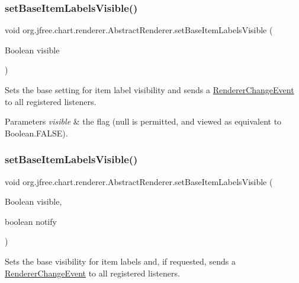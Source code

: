 \subsubsection{\texorpdfstring{set\+Base\+Item\+Labels\+Visible()}{setBaseItemLabelsVisible()}\hspace{0.1cm}{\footnotesize\ttfamily [2/3]}}
{\footnotesize\ttfamily void org.\+jfree.\+chart.\+renderer.\+Abstract\+Renderer.\+set\+Base\+Item\+Labels\+Visible (\begin{DoxyParamCaption}\item[{Boolean}]{visible }\end{DoxyParamCaption})}

Sets the base setting for item label visibility and sends a \mbox{\hyperlink{}{Renderer\+Change\+Event}} to all registered listeners.


\begin{DoxyParams}{Parameters}
{\em visible} & the flag ({\ttfamily null} is permitted, and viewed as equivalent to {\ttfamily Boolean.\+F\+A\+L\+SE}). \\
\hline
\end{DoxyParams}
\mbox{\label{classorg_1_1jfree_1_1chart_1_1renderer_1_1_abstract_renderer_aacaab05820eb971e6b960878f4beab5e}} 
\subsubsection{\texorpdfstring{set\+Base\+Item\+Labels\+Visible()}{setBaseItemLabelsVisible()}\hspace{0.1cm}{\footnotesize\ttfamily [3/3]}}
{\footnotesize\ttfamily void org.\+jfree.\+chart.\+renderer.\+Abstract\+Renderer.\+set\+Base\+Item\+Labels\+Visible (\begin{DoxyParamCaption}\item[{Boolean}]{visible,  }\item[{boolean}]{notify }\end{DoxyParamCaption})}

Sets the base visibility for item labels and, if requested, sends a \mbox{\hyperlink{}{Renderer\+Change\+Event}} to all registered listeners.


